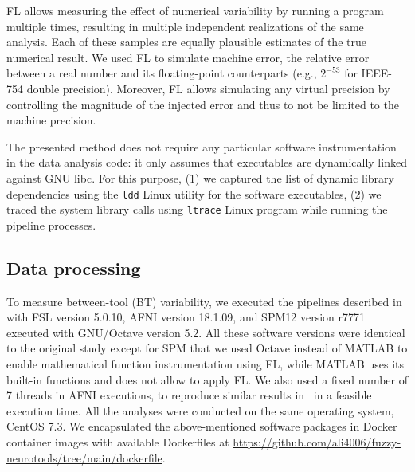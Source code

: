 
%

FL allows measuring the effect of numerical variability by running a program multiple times, 
resulting in multiple independent realizations of the same analysis. Each of these samples 
are equally plausible estimates of the true numerical result. 
We used FL to simulate machine error, the relative error between a real number and its floating-point counterparts
(e.g., $2^{-53}$ for IEEE-754 double precision).
Moreover, FL allows simulating any virtual precision
by controlling the magnitude of the injected error and
thus to not be limited to the machine precision.

The presented method does not require any
particular software instrumentation in the data analysis code: it only
assumes that executables are dynamically linked against GNU libc. For this purpose,
(1) we captured the list of dynamic library dependencies using the \texttt{ldd} Linux utility for the software executables,
(2) we traced the system library calls using \texttt{ltrace} Linux program while running the pipeline processes.

\subsection{Data processing}

To measure between-tool (BT) variability, we executed the pipelines described in~\cite{bowring2019exploring}
with FSL version 5.0.10, AFNI version 18.1.09, and SPM12 version r7771
executed with GNU/Octave version 5.2.
All these software versions were identical to the original study except for SPM
that we used Octave instead of MATLAB to enable mathematical function instrumentation using FL,
while MATLAB uses its built-in functions and does not allow to apply FL.
We also used a fixed number of 7 threads in AFNI executions,
to reproduce similar results in~\cite{bowring2019exploring} in a feasible execution time.
All the analyses were conducted on the same operating system, CentOS 7.3.
We encapsulated the above-mentioned software packages in Docker container images with available Dockerfiles at \url{https://github.com/ali4006/fuzzy-neurotools/tree/main/dockerfile}.

